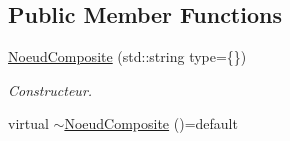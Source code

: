 \subsection*{Public Member Functions}
\begin{DoxyCompactItemize}
\item 
\hypertarget{group__inf2990_ga9493824e1865121cb75097a28132573b}{}\hyperlink{group__inf2990_ga9493824e1865121cb75097a28132573b}{Noeud\+Composite} (std\+::string type=\{\})\label{group__inf2990_ga9493824e1865121cb75097a28132573b}

\begin{DoxyCompactList}\small\item\em Constructeur. \end{DoxyCompactList}\item 
\hypertarget{class_noeud_composite_af221c032fbc9d58e3344ee1b122095cd}{}virtual \hyperlink{class_noeud_composite_af221c032fbc9d58e3344ee1b122095cd}{$\sim$\+Noeud\+Composite} ()=default\label{class_noeud_composite_af221c032fbc9d58e3344ee1b122095cd}


\end{DoxyCompactItemize}
